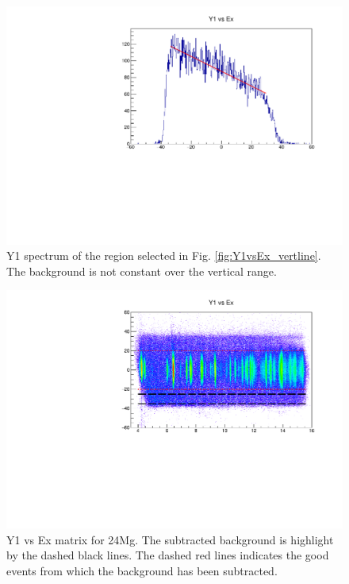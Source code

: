 \documentclass[]{report}
\begin{document}
		\begin{figure}
			\includegraphics[width=\linewidth]{Figure/bkg/Chained_24Mg_Y1_projection.pdf}
			\caption{Y1 spectrum of the region selected in Fig. \ref{fig:Y1vsEx_vertline}. The background is not constant over the vertical range.}
			\label{fig:Y1projection_bkg}
		\end{figure}

		\begin{figure}
			\includegraphics[width=\linewidth]{Figure/bkg/Chained_24Mg_Y1vsEx.pdf}
			\caption{Y1 vs Ex matrix for 24Mg. The subtracted background is highlight by the dashed black lines. The dashed red lines indicates the good events from which the background has been subtracted.}
			\label{fig:Y1vsEx_orizline}
		\end{figure}
\end{document}

